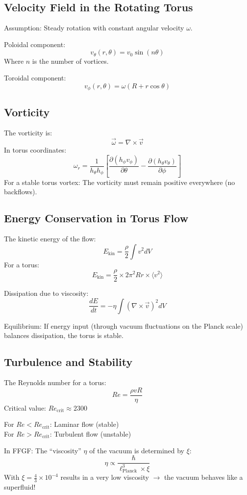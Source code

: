 \documentclass[12pt,a4paper]{article}
\begin{document}
\subsection{Velocity Field in the Rotating Torus}
Assumption: Steady rotation with constant angular velocity \( \omega \).

Poloidal component:
\[
v_\theta(r, \theta) = v_0 \sin(n \theta)
\]
Where \( n \) is the number of vortices.

Toroidal component:
\[
v_\phi(r, \theta) = \omega (R + r \cos \theta)
\]

\subsection{Vorticity}
The vorticity is:
\[
\vec{\omega} = \nabla \times \vec{v}
\]
In torus coordinates:
\[
\omega_r = \frac{1}{h_\theta h_\phi} \left[ \frac{\partial (h_\phi v_\phi)}{\partial \theta} - \frac{\partial (h_\theta v_\theta)}{\partial \phi} \right]
\]
For a stable torus vortex: The vorticity must remain positive everywhere (no backflows).

\subsection{Energy Conservation in Torus Flow}
The kinetic energy of the flow:
\[
E_{\text{kin}} = \frac{\rho}{2} \int v^2 dV
\]
For a torus:
\[
E_{\text{kin}} = \frac{\rho}{2} \times 2\pi^2 R r \times \langle v^2 \rangle
\]

Dissipation due to viscosity:
\[
\frac{dE}{dt} = -\eta \int (\nabla \times \vec{v})^2 dV
\]

Equilibrium: If energy input (through vacuum fluctuations on the Planck scale) balances dissipation, the torus is stable.

\subsection{Turbulence and Stability}
The Reynolds number for a torus:
\[
Re = \frac{\rho v R}{\eta}
\]
Critical value: \( Re_{\text{crit}} \approx 2300 \)

For \( Re < Re_{\text{crit}} \): Laminar flow (stable) \\
For \( Re > Re_{\text{crit}} \): Turbulent flow (unstable)

In FFGF:
The ``viscosity'' \( \eta \) of the vacuum is determined by \( \xi \):
\[
\eta \propto \frac{\hbar}{\ell_{\text{Planck}}^3 \times \xi}
\]
With \( \xi = \frac{4}{3} \times 10^{-4} \) results in a very low viscosity \( \rightarrow \) the vacuum behaves like a superfluid!
\end{document}
